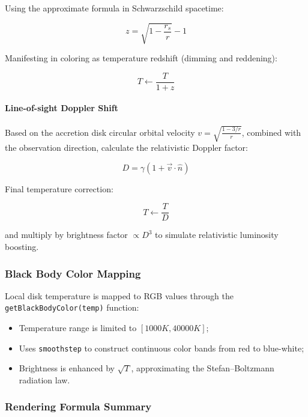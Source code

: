 \documentclass[11pt,a4paper]{article}
\begin{document}
Using the approximate formula in Schwarzschild spacetime:

\begin{equation}
z = \sqrt{1 - \frac{r_s}{r}} - 1
\end{equation}

Manifesting in coloring as temperature redshift (dimming and reddening):

\begin{equation}
T \leftarrow \frac{T}{1 + z}
\end{equation}

\paragraph{Line-of-sight Doppler Shift}

Based on the accretion disk circular orbital velocity $v = \sqrt{\frac{1 - 3/r}{r}}$, combined with the observation direction, calculate the relativistic Doppler factor:

\begin{equation}
D = \gamma(1 + \vec{v} \cdot \hat{n})
\end{equation}

Final temperature correction:

\begin{equation}
T \leftarrow \frac{T}{D}
\end{equation}

and multiply by brightness factor $\propto D^3$ to simulate relativistic luminosity boosting.

\subsubsection{Black Body Color Mapping}

Local disk temperature is mapped to RGB values through the \texttt{getBlackBodyColor(temp)} function:

\begin{itemize}
    \item Temperature range is limited to $[1000K, 40000K]$;
    \item Uses \texttt{smoothstep} to construct continuous color bands from red to blue-white;
    \item Brightness is enhanced by $\sqrt{T}$, approximating the Stefan–Boltzmann radiation law.
\end{itemize}

\subsubsection{Rendering Formula Summary}
\end{document}
